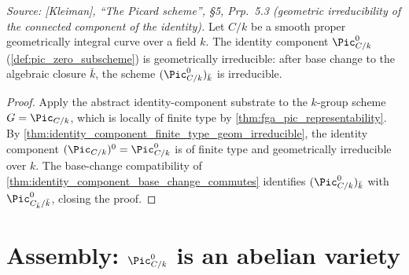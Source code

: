 \begin{theorem}
  \label{thm:pic0_geom_irred}

  \textit{Source: [Kleiman], ``The Picard scheme'', \S 5, Prp.~5.3
  (geometric irreducibility of the connected component of the
  identity).}
  Let \(C/k\) be a smooth proper geometrically integral curve over a
  field \(k\). The identity component \(\Pic^0_{C/k}\)
  (\cref{def:pic_zero_subscheme}) is geometrically irreducible: after
  base change to the algebraic closure \(\bar k\), the scheme
  \((\Pic^0_{C/k})_{\bar k}\) is irreducible.
\end{theorem}

\begin{proof}\leanok
  Apply the abstract identity-component substrate to the \(k\)-group
  scheme \(G = \Pic_{C/k}\), which is locally of finite type by
  \cref{thm:fga_pic_representability}. By
  \cref{thm:identity_component_finite_type_geom_irreducible}, the
  identity component \((\Pic_{C/k})^0 = \Pic^0_{C/k}\) is of finite
  type and geometrically irreducible over \(k\). The base-change
  compatibility of
  \cref{thm:identity_component_base_change_commutes} identifies
  \((\Pic^0_{C/k})_{\bar k}\) with \(\Pic^0_{C_{\bar k}/\bar k}\),
  closing the proof.
\end{proof}

\section{Assembly: \(\Pic^0_{C/k}\) is an abelian variety}
\label{sec:pic0_isAbelianVariety}

